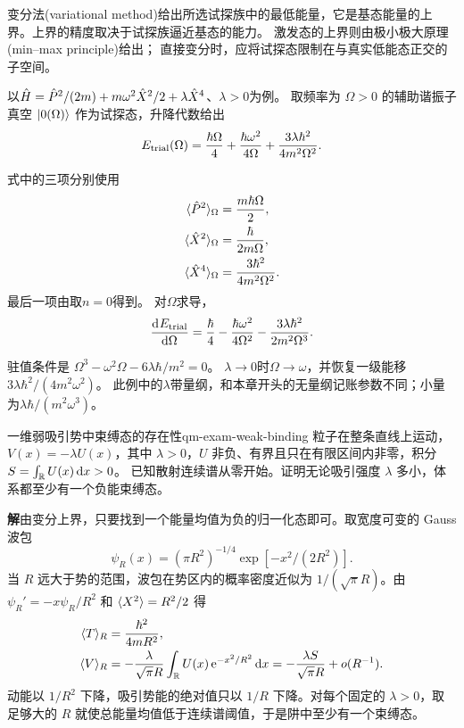 变分法(variational method)给出所选试探族中的最低能量，它是基态能量的上界。上界的精度取决于试探族逼近基态的能力。
激发态的上界则由极小极大原理(min--max principle)给出；
直接变分时，应将试探态限制在与真实低能态正交的子空间。

以$\hat{H} = \hat{P}^2/(2m) + m\omega^2\hat{X}^2/2 + \lambda \hat{X}^4$、$\lambda > 0$为例。
取频率为 $\Omega > 0$ 的辅助谐振子真空 $\lvert0(\Omega)\rangle$ 作为试探态，升降代数给出
\begin{equation}
    E_{\mathrm{trial}}(\Omega) = \frac{\hbar\Omega}{4}
    + \frac{\hbar\omega^2}{4\Omega}
    + \frac{3\lambda\hbar^2}{4m^2\Omega^2}.
\end{equation}

式中的三项分别使用
\begin{subequations}
    \begin{align}
        \langle\hat{P}^2\rangle_\Omega &= \frac{m\hbar\Omega}{2},\\
        \langle\hat{X}^2\rangle_\Omega &= \frac{\hbar}{2m\Omega},\\
        \langle\hat{X}^4\rangle_\Omega &= \frac{3\hbar^2}{4m^2\Omega^2}.
    \end{align}
\end{subequations}
最后一项由取$n = 0$得到。
对$\Omega$求导，
\[
    \frac{\mathop{}\!\mathrm{d}^{}E_{\mathrm{trial}}}{\mathrm{d}{\Omega}^{}}
    = \frac{\hbar}{4} - \frac{\hbar\omega^2}{4\Omega^2}
    - \frac{3\lambda\hbar^2}{2m^2\Omega^3}.
\]

驻值条件是
$\Omega^3 - \omega^2\Omega - 6\lambda\hbar/m^2 = 0$。
$\lambda \to 0$时$\Omega \to \omega$，并恢复一级能移
$3\lambda\hbar^2/(4m^2\omega^2)$。
此例中的$\lambda$带量纲，和本章开头的无量纲记账参数不同；小量为$\lambda\hbar/(m^2\omega^3)$。

\begin{example}{一维弱吸引势中束缚态的存在性}{qm-exam-weak-binding}
    粒子在整条直线上运动，$V(x) = -\lambda U(x)$，其中 $\lambda > 0$，$U$ 非负、有界且只在有限区间内非零，积分 $S = \int_{\mathbb{R}} U(x)\mathop{}\!\mathrm{d} x > 0$。
    已知散射连续谱从零开始。证明无论吸引强度 $\lambda$ 多小，体系都至少有一个负能束缚态。

    \par\smallskip\textbf{解}\quad 由变分上界，只要找到一个能量均值为负的归一化态即可。取宽度可变的 Gauss 波包
    \[
        \psi_R(x) = (\pi R^2)^{-1/4}\exp[-x^2/(2R^2)] .
    \]
    当 $R$ 远大于势的范围，波包在势区内的概率密度近似为 $1/(\sqrt\pi R)$。由 $\psi_R' = -x\psi_R/R^2$ 和 $\langle X^2\rangle = R^2/2$ 得
    \begin{align*}
        \langle T\rangle_R &= \frac{\hbar^2}{4mR^2},\\
        \langle V\rangle_R &= -\frac{\lambda}{\sqrt\pi R}\int_{\mathbb{R}} U(x)\mathop{}\!\mathrm{e}^{-x^2/R^2}\mathop{}\!\mathrm{d} x
                   = -\frac{\lambda S}{\sqrt\pi R} + o(R^{-1}) .
    \end{align*}
    动能以 $1/R^2$ 下降，吸引势能的绝对值只以 $1/R$ 下降。对每个固定的 $\lambda > 0$，取足够大的 $R$ 就使总能量均值低于连续谱阈值，于是阱中至少有一个束缚态。
\end{example}

